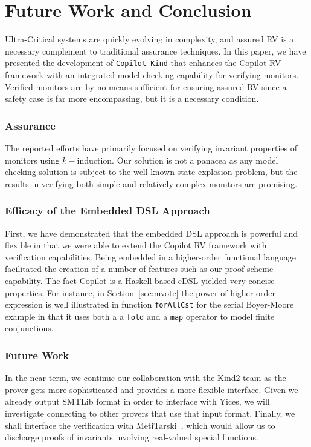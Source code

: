 \section{Future Work and Conclusion}\label{sec:conclusion}

 Ultra-Critical systems are quickly evolving in complexity, and assured
 RV is a necessary complement to traditional assurance techniques.  
In this paper, we have presented the development of
\texttt{Copilot-Kind} that enhances the Copilot RV framework with an
integrated model-checking capability for verifying monitors.
Verified  monitors are by no means sufficient for ensuring assured RV
since a safety case is far more encompassing, but it is a necessary
condition.


\subsubsection{Assurance} The reported efforts have
primarily focused on verifying invariant properties of monitors using
$k-$induction. Our solution is not a panacea as any model checking
solution is subject to the well known state explosion problem, but 
the results in verifying both simple and relatively complex monitors
are promising. 

\subsubsection{Efficacy of the Embedded DSL Approach} First, we have
demonstrated that the embedded DSL approach is powerful and flexible
in that we were able to extend the Copilot RV framework with
verification capabilities. Being embedded in a  higher-order functional language
facilitated the creation of  a number of features such as our proof
scheme capability. The fact Copilot is a Haskell based eDSL yielded
very  concise properties. For instance, in Section~\ref{sec:mvote}
the power of higher-order expression is well illustrated in 
function  \texttt{forAllCst} for the
serial Boyer-Moore example in that it  uses both a  a \texttt{fold}
and a \texttt{map} operator to model finite conjunctions. 


\subsubsection{Future Work} In the near term, we continue our
collaboration with the Kind2 team as the prover gets more
sophisticated and provides a more flexible interface. Given we already
output SMTLib format in order to interface with Yices, we will
investigate connecting to other provers that use that input
format. Finally, we shall interface the verification with
MetiTarski~\cite{AkbarpourPaulson}, which would allow us to discharge
proofs of invariants involving real-valued special functions.


